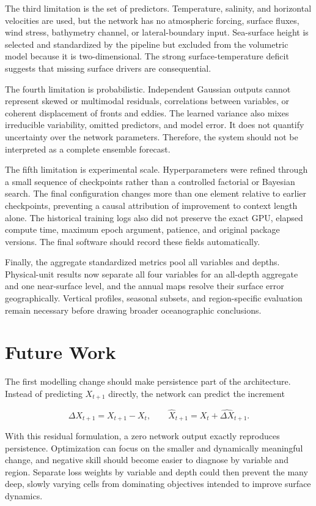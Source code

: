 The third limitation is the set of predictors. Temperature, salinity, and horizontal velocities are used, but the network has no atmospheric forcing, surface fluxes, wind stress, bathymetry channel, or lateral-boundary input. Sea-surface height is selected and standardized by the pipeline but excluded from the volumetric model because it is two-dimensional. The strong surface-temperature deficit suggests that missing surface drivers are consequential.

The fourth limitation is probabilistic. Independent Gaussian outputs cannot represent skewed or multimodal residuals, correlations between variables, or coherent displacement of fronts and eddies. The learned variance also mixes irreducible variability, omitted predictors, and model error. It does not quantify uncertainty over the network parameters. Therefore, the system should not be interpreted as a complete ensemble forecast.

The fifth limitation is experimental scale. Hyperparameters were refined through a small sequence of checkpoints rather than a controlled factorial or Bayesian search. The final configuration changes more than one element relative to earlier checkpoints, preventing a causal attribution of improvement to context length alone. The historical training logs also did not preserve the exact GPU, elapsed compute time, maximum epoch argument, patience, and original package versions. The final software should record these fields automatically.

Finally, the aggregate standardized metrics pool all variables and depths. Physical-unit results now separate all four variables for an all-depth aggregate and one near-surface level, and the annual maps resolve their surface error geographically. Vertical profiles, seasonal subsets, and region-specific evaluation remain necessary before drawing broader oceanographic conclusions.

\section{Future Work}

The first modelling change should make persistence part of the architecture. Instead of predicting $X_{t+1}$ directly, the network can predict the increment

\[
\Delta X_{t+1}=X_{t+1}-X_t,
\qquad
\widehat{X}_{t+1}=X_t+\widehat{\Delta X}_{t+1}.
\]

With this residual formulation, a zero network output exactly reproduces persistence. Optimization can focus on the smaller and dynamically meaningful change, and negative skill should become easier to diagnose by variable and region. Separate loss weights by variable and depth could then prevent the many deep, slowly varying cells from dominating objectives intended to improve surface dynamics.

